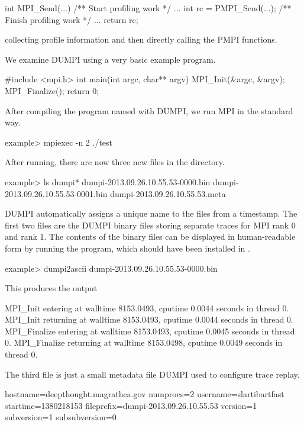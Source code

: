 \begin{CppCode}
int MPI_Send(...)
{
  /** Start profiling work */
  ...
  int rc = PMPI_Send(...);
  /** Finish profiling work */
  ...
  return rc;
}
\end{CppCode}
collecting profile information and then directly calling the PMPI functions.

We examine DUMPI using a very basic example program.

\begin{CppCode}
#include <mpi.h>
int main(int argc, char** argv)
{
  MPI_Init(&argc, &argv);
  MPI_Finalize();
  return 0;
}
\end{CppCode}
After compiling the program named  with DUMPI, we run MPI in the standard way.

\begin{ShellCmd}
example> mpiexec -n 2 ./test
\end{ShellCmd}
After running, there are now three new files in the directory.

\begin{ShellCmd}
example> ls dumpi*
dumpi-2013.09.26.10.55.53-0000.bin	
dumpi-2013.09.26.10.55.53-0001.bin	
dumpi-2013.09.26.10.55.53.meta
\end{ShellCmd}
DUMPI automatically assigns a unique name to the files from a timestamp.
The first two files are the DUMPI binary files storing separate traces for MPI rank 0 and rank 1.
The contents of the binary files can be displayed in human-readable form by running the 
program, which should have been installed in .

\begin{ShellCmd}
example> dumpi2ascii dumpi-2013.09.26.10.55.53-0000.bin
\end{ShellCmd}
This produces the output

\begin{ViFile}
MPI_Init entering at walltime 8153.0493, cputime 0.0044 seconds in thread 0.
MPI_Init returning at walltime 8153.0493, cputime 0.0044 seconds in thread 0.
MPI_Finalize entering at walltime 8153.0493, cputime 0.0045 seconds in thread 0.
MPI_Finalize returning at walltime 8153.0498, cputime 0.0049 seconds in thread 0.
\end{ViFile}
The third file is just a small metadata file DUMPI used to configure trace replay.

\begin{ViFile}
hostname=deepthought.magrathea.gov
numprocs=2
username=slartibartfast
startime=1380218153
fileprefix=dumpi-2013.09.26.10.55.53
version=1
subversion=1
subsubversion=0
\end{ViFile}

